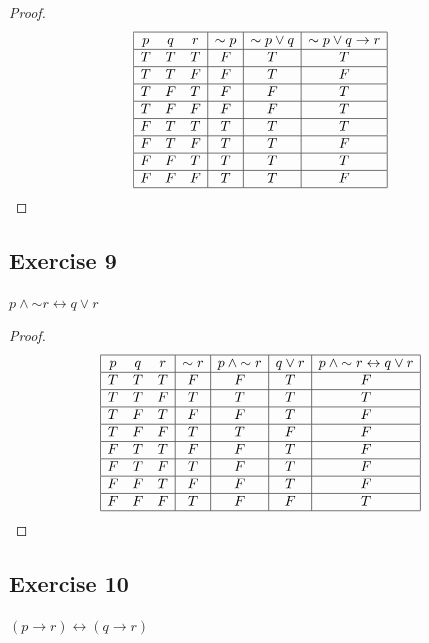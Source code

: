 \documentclass[14pt]{extarticle}
\newcommand{\bic}{\leftrightarrow}
\begin{document}
\begin{proof}
$$
\begin{array}{|ccc|c|c|c|}
\hline
p & q & r & {\sim p} & {\sim p} \vee q & {\sim p} \vee q \to r\\
\hline
T & T & T & F & T & T \\
\hline
T & T & F & F & T & F \\
\hline
T & F & T & F & F & T \\
\hline
T & F & F & F & F & T \\
\hline
F & T & T & T & T & T \\
\hline
F & T & F & T & T & F \\
\hline
F & F & T & T & T & T \\
\hline
F & F & F & T & T & F \\
\hline
\end{array}
$$
\end{proof}

\subsection{Exercise 9}
$p \wedge {\sim r} \bic q \vee r$

\begin{proof}
$$
\begin{array}{|ccc|c|c|c|c|}
\hline
p & q & r & {\sim r} & p \wedge {\sim r} & q \vee r & p \wedge {\sim r} \bic q \vee r \\
\hline
T & T & T & F & F & T & F \\
\hline
T & T & F & T & T & T & T \\
\hline
T & F & T & F & F & T & F \\
\hline
T & F & F & T & T & F & F \\
\hline
F & T & T & F & F & T & F \\
\hline
F & T & F & T & F & T & F \\
\hline
F & F & T & F & F & T & F \\
\hline
F & F & F & T & F & F & T \\
\hline
\end{array}
$$
\end{proof}

\subsection{Exercise 10}
$(p \to r) \bic (q \to r)$
\end{document}
